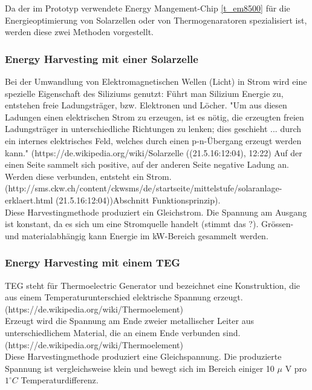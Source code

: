 Da der im Prototyp verwendete Energy Mangement-Chip \ref{t_em8500} für die Energieoptimierung von Solarzellen oder von Thermogenaratoren spezialisiert ist, werden diese zwei Methoden vorgestellt. 

\subsubsection{Energy Harvesting mit einer Solarzelle}\label{harv_solarzelle} 


Bei der Umwandlung von Elektromagnetischen Wellen (Licht) in Strom wird eine spezielle Eigenschaft des Siliziums genutzt: Führt man Silizium Energie zu, entstehen freie Ladungsträger, bzw. Elektronen und Löcher. "Um aus diesen Ladungen einen elektrischen Strom zu erzeugen, ist es nötig, die erzeugten freien Ladungsträger in unterschiedliche Richtungen zu lenken; dies geschieht ... durch ein internes elektrisches Feld, welches durch einen p-n-Übergang erzeugt werden kann." (https://de.wikipedia.org/wiki/Solarzelle ((21.5.16:12:04), 12:22)
Auf der einen Seite sammelt sich positive, auf der anderen Seite negative Ladung an. Werden diese verbunden, entsteht ein Strom. \\

(http://sms.ckw.ch/content/ckwsms/de/startseite/mittelstufe/solaranlage-erklaert.html   (21.5.16:12:04))Abschnitt Funktionsprinzip). \\

Diese Harvestingmethode produziert ein Gleichstrom. Die Spannung am Ausgang ist konstant, da es sich um eine Stromquelle handelt (stimmt das ?). Grössen- und materialabhängig kann Energie im kW-Bereich gesammelt werden.



\subsubsection{Energy Harvesting mit einem TEG}\label{harv_TEG} 
TEG steht für Thermoelectric Generator und bezeichnet eine Konstruktion, die aus einem Temperaturunterschied elektrische Spannung erzeugt. (https://de.wikipedia.org/wiki/Thermoelement)\\
Erzeugt wird die Spannung am Ende zweier metallischer Leiter aus unterschiedlichem Material, die an einem Ende verbunden sind.(https://de.wikipedia.org/wiki/Thermoelement)\\


Diese Harvestingmethode produziert eine Gleichspannung. Die produzierte Spannung ist vergleichsweise klein und bewegt sich im Bereich einiger 10 $\mu$ V pro $1^\circ C$ Temperaturdifferenz.


